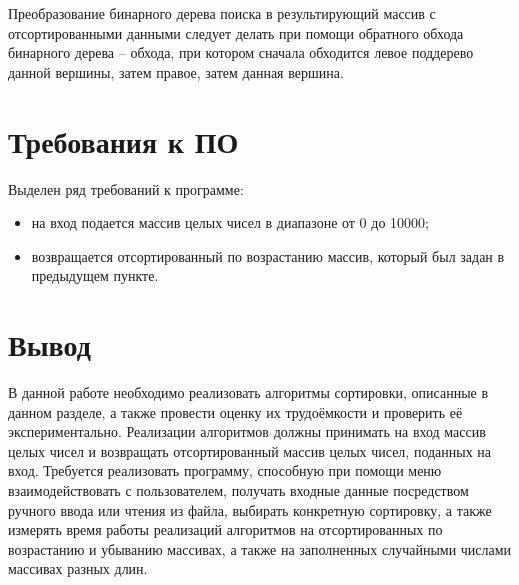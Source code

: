Преобразование бинарного дерева поиска в результирующий массив с отсортированными данными следует делать при помощи обратного обхода бинарного дерева -- обхода, при котором сначала обходится левое поддерево данной вершины, затем правое, затем данная вершина.

\section{Требования к ПО}
Выделен ряд требований к программе:
\begin{itemize}[label=---]
	\item на вход подается массив целых чисел в диапазоне от 0 до 10000;
	\item возвращается отсортированный по возрастанию массив, который был задан в предыдущем пункте. \newline
\end{itemize}


\section*{Вывод}
В данной работе необходимо реализовать алгоритмы сортировки, описанные в данном разделе, а также провести оценку их трудоёмкости и проверить её экспериментально. Реализации алгоритмов должны принимать на вход массив целых чисел и возвращать отсортированный массив целых чисел, поданных на вход. Требуется реализовать программу, способную при помощи меню взаимодействовать с пользователем, получать входные данные посредством ручного ввода или чтения из файла, выбирать конкретную сортировку, а также измерять время работы реализаций алгоритмов на отсортированных по возрастанию и убыванию массивах, а также на заполненных случайными числами массивах разных длин.